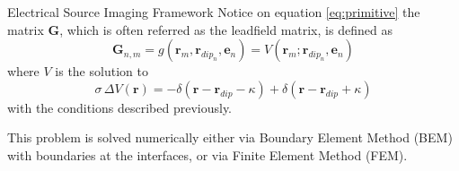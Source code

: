 \documentclass[progressbar=head]{beamer}
\newcommand{\ppar}[1]{ \left( #1 \right) }
\newcommand{\G}{\mathbf{G}}
\newcommand{\rr}{\mathbf{r}}
\begin{document}
\begin{frame}{Electrical Source Imaging Framework}
Notice on equation \eqref{eq:primitive} the matrix $\G$, which is often referred as the \alert{leadfield matrix}, is defined as
\begin{equation*}
    \mathbf{G}_{n,m} =
    g\ppar{\rr_m, \rr_{dip_{n}}, \mathbf{e}_{n}} =
    V\ppar{\rr_m; \rr_{dip_{n}}, \mathbf{e}_{n}}
\end{equation*}
where $V$ is the solution to 
\begin{equation}
\sigma\,
\Delta V(\rr)
= 
-\delta\ppar{\rr-\rr_{dip}-\kappa} + \delta\ppar{\rr-\rr_{dip}+\kappa}
\end{equation}
with the conditions described previously.

This problem is solved numerically either via Boundary Element Method (BEM) with boundaries at the interfaces, or via Finite Element Method (FEM).
\end{frame}


 


%
\end{document}
